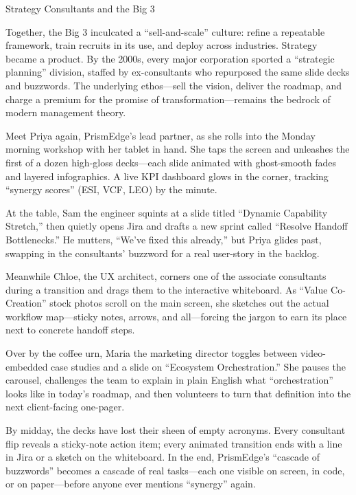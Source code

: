 \begin{HistoricalSidebar}{Strategy Consultants and the Big 3}
  \medskip
  
  Together, the Big 3 inculcated a “sell-and-scale” culture: refine a repeatable framework, train recruits in its use, 
  and deploy across industries.  Strategy became a product.  By the 2000s, every major corporation sported a 
  “strategic planning” division, staffed by ex-consultants who repurposed the same slide decks and buzzwords.  The 
  underlying ethos—sell the vision, deliver the roadmap, and charge a premium for the promise of transformation—remains 
  the bedrock of modern management theory.  

\end{HistoricalSidebar}

\medskip

Meet Priya again, PrismEdge’s lead partner, as she rolls into the Monday morning workshop with her tablet in hand. 
She taps the screen and unleashes the first of a dozen high-gloss decks—each slide animated with ghost-smooth fades 
and layered infographics. A live KPI dashboard glows in the corner, tracking “synergy scores” (ESI, VCF, LEO) by 
the minute.

At the table, Sam the engineer squints at a slide titled “Dynamic Capability Stretch,” then quietly opens Jira and 
drafts a new sprint called “Resolve Handoff Bottlenecks.” He mutters, “We’ve fixed this already,” but Priya glides 
past, swapping in the consultants’ buzzword for a real user-story in the backlog.

Meanwhile Chloe, the UX architect, corners one of the associate consultants during a transition and drags them to 
the interactive whiteboard. As “Value Co-Creation” stock photos scroll on the main screen, she sketches out the 
actual workflow map—sticky notes, arrows, and all—forcing the jargon to earn its place next to concrete handoff steps.

Over by the coffee urn, Maria the marketing director toggles between video-embedded case studies and a slide on 
“Ecosystem Orchestration.” She pauses the carousel, challenges the team to explain in plain English what 
“orchestration” looks like in today’s roadmap, and then volunteers to turn that definition into the next client-facing 
one-pager.

By midday, the decks have lost their sheen of empty acronyms. Every consultant flip reveals a sticky-note action item; 
every animated transition ends with a line in Jira or a sketch on the whiteboard. In the end, PrismEdge’s “cascade of 
buzzwords” becomes a cascade of real tasks—each one visible on screen, in code, or on paper—before anyone ever 
mentions “synergy” again.


